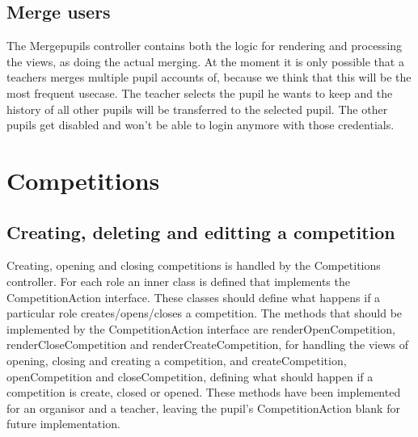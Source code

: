 \documentclass[11pt,a4paper]{article}
\begin{document}
\subsection{Merge users}
The Mergepupils controller contains both the logic for rendering and processing the views, as doing the actual merging. At the moment it is only possible that a teachers merges multiple pupil accounts of, because we think that this will be the most frequent usecase. The teacher selects the pupil he wants to keep and the history of all other pupils will be transferred to the selected pupil. The other pupils get disabled and won't be able to login anymore with those credentials.


\section{Competitions}
\subsection{Creating, deleting and editting a competition}
Creating, opening and closing competitions is handled by the Competitions controller. For each role an inner class is defined that implements the CompetitionAction interface. These classes should define what happens if a particular role creates/opens/closes a competition. The methods that should be implemented  by the CompetitionAction interface are renderOpenCompetition, renderCloseCompetition and renderCreateCompetition, for handling the views of opening, closing and creating a competition, and createCompetition, openCompetition and closeCompetition, defining what should happen if a competition is create, closed or opened. These methods have been implemented for an organisor and a teacher, leaving the pupil's CompetitionAction blank for future implementation.
\end{document}
